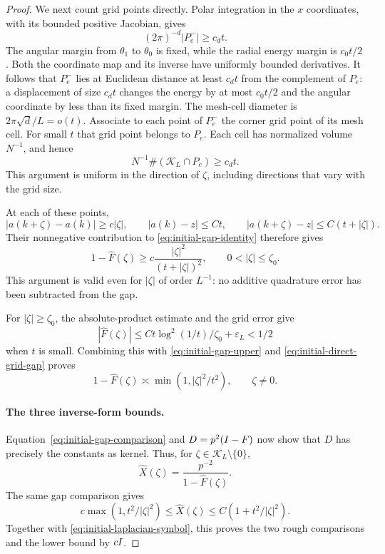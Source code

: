 \begin{proof}
We next count grid points directly. Polar integration in the $x$
coordinates, with its bounded positive Jacobian, gives
\[
 (2\pi)^{-d}|P_e^-|\ge c_dt.
\]
The angular margin from $\theta_1$ to $\theta_0$ is fixed, while
the radial energy margin is $c_0t/2$. Both the coordinate map and
its inverse have uniformly bounded derivatives. It follows that
$P_e^-$ lies at Euclidean distance at least $c_dt$ from the complement
of $P_e$: a displacement of size $c_dt$ changes the energy by at
most $c_0t/2$ and the angular coordinate by less than its fixed margin.
The mesh-cell diameter is $2\pi\sqrt d/L=o(t)$. Associate to each
point of $P_e^-$ the corner grid point of its mesh cell. For small $t$
that grid point belongs to $P_e$. Each cell has normalized volume
$N^{-1}$, and hence
\begin{equation}\label{eq:initial-grid-patch-count}
 N^{-1}\#(\mathcal K_L\cap P_e)\ge c_dt.
\end{equation}
This argument is uniform in the direction of $\zeta$, including
directions that vary with the grid size.

At each of these points,
\[
 |a(k+\zeta)-a(k)|\ge c|\zeta|,\qquad
 |a(k)-z|\le Ct,\qquad
 |a(k+\zeta)-z|\le C(t+|\zeta|).
\]
Their nonnegative contribution to \eqref{eq:initial-gap-identity}
therefore gives
\begin{equation}\label{eq:initial-direct-grid-gap}
 1-\widehat F(\zeta)
 \ge c\frac{|\zeta|^2}{(t+|\zeta|)^2},
       \qquad 0<|\zeta|\le\zeta_0.
\end{equation}
This argument is valid even for $|\zeta|$ of order $L^{-1}$: no
additive quadrature error has been subtracted from the gap.

For $|\zeta|\ge\zeta_0$, the absolute-product estimate and the grid
error give
\[
 |\widehat F(\zeta)|
 \le Ct\log^2(1/t)/\zeta_0+\varepsilon_L<1/2
\]
when $t$ is small.  Combining this with
\eqref{eq:initial-gap-upper} and \eqref{eq:initial-direct-grid-gap}
proves
\begin{equation}\label{eq:initial-gap-comparison}
 1-\widehat F(\zeta)\asymp
       \min(1,|\zeta|^2/t^2),\qquad \zeta\ne0.
\end{equation}

\paragraph{The three inverse-form bounds.}
Equation~\eqref{eq:initial-gap-comparison} and $D=p^2(I-F)$ now show
that $D$ has precisely the constants as kernel. Thus, for
$\zeta\in\mathcal K_L\setminus\{0\}$,
\[
 \widehat X(\zeta)=\frac{p^{-2}}{1-\widehat F(\zeta)}.
\]
The same gap comparison gives
\[
 c\max(1,t^2/|\zeta|^2)
 \le\widehat X(\zeta)
 \le C(1+t^2/|\zeta|^2).
\]
Together with \eqref{eq:initial-laplacian-symbol}, this proves the two
rough comparisons and the lower bound by $cI$.


\end{proof}
